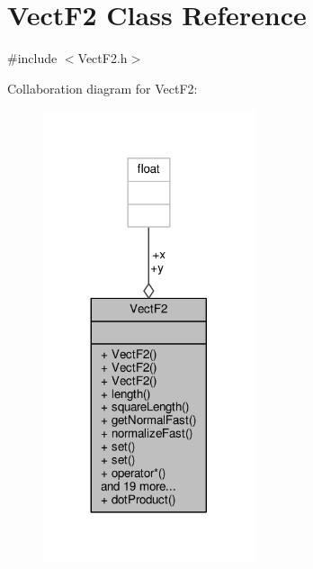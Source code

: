 \hypertarget{classVectF2}{\section{Vect\-F2 Class Reference}
\label{classVectF2}
}


{\ttfamily \#include $<$Vect\-F2.\-h$>$}



Collaboration diagram for Vect\-F2\-:
\nopagebreak
\begin{figure}[H]
\begin{center}
\leavevmode
\includegraphics[width=176pt]{classVectF2__coll__graph}
\end{center}
\end{figure}
